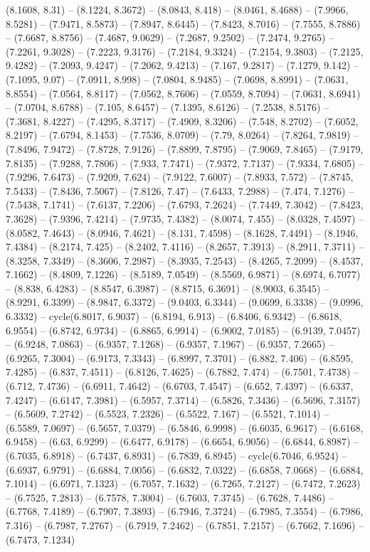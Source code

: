 (8.1608, 8.31) -- (8.1224, 8.3672) -- (8.0843, 8.418) -- (8.0461, 8.4688) -- (7.9966, 8.5281) -- (7.9471, 8.5873) -- (7.8947, 8.6445) -- (7.8423, 8.7016) -- (7.7555, 8.7886) -- (7.6687, 8.8756) -- (7.4687, 9.0629) -- (7.2687, 9.2502) -- (7.2474, 9.2765) -- (7.2261, 9.3028) -- (7.2223, 9.3176) -- (7.2184, 9.3324) -- (7.2154, 9.3803) -- (7.2125, 9.4282) -- (7.2093, 9.4247) -- (7.2062, 9.4213) -- (7.167, 9.2817) -- (7.1279, 9.142) -- (7.1095, 9.07) -- (7.0911, 8.998) -- (7.0804, 8.9485) -- (7.0698, 8.8991) -- (7.0631, 8.8554) -- (7.0564, 8.8117) -- (7.0562, 8.7606) -- (7.0559, 8.7094) -- (7.0631, 8.6941) -- (7.0704, 8.6788) -- (7.105, 8.6457) -- (7.1395, 8.6126) -- (7.2538, 8.5176) -- (7.3681, 8.4227) -- (7.4295, 8.3717) -- (7.4909, 8.3206) -- (7.548, 8.2702) -- (7.6052, 8.2197) -- (7.6794, 8.1453) -- (7.7536, 8.0709) -- (7.79, 8.0264) -- (7.8264, 7.9819) -- (7.8496, 7.9472) -- (7.8728, 7.9126) -- (7.8899, 7.8795) -- (7.9069, 7.8465) -- (7.9179, 7.8135) -- (7.9288, 7.7806) -- (7.933, 7.7471) -- (7.9372, 7.7137) -- (7.9334, 7.6805) -- (7.9296, 7.6473) -- (7.9209, 7.624) -- (7.9122, 7.6007) -- (7.8933, 7.572) -- (7.8745, 7.5433) -- (7.8436, 7.5067) -- (7.8126, 7.47) -- (7.6433, 7.2988) -- (7.474, 7.1276) -- (7.5438, 7.1741) -- (7.6137, 7.2206) -- (7.6793, 7.2624) -- (7.7449, 7.3042) -- (7.8423, 7.3628) -- (7.9396, 7.4214) -- (7.9735, 7.4382) -- (8.0074, 7.455) -- (8.0328, 7.4597) -- (8.0582, 7.4643) -- (8.0946, 7.4621) -- (8.131, 7.4598) -- (8.1628, 7.4491) -- (8.1946, 7.4384) -- (8.2174, 7.425) -- (8.2402, 7.4116) -- (8.2657, 7.3913) -- (8.2911, 7.3711) -- (8.3258, 7.3349) -- (8.3606, 7.2987) -- (8.3935, 7.2543) -- (8.4265, 7.2099) -- (8.4537, 7.1662) -- (8.4809, 7.1226) -- (8.5189, 7.0549) -- (8.5569, 6.9871) -- (8.6974, 6.7077) -- (8.838, 6.4283) -- (8.8547, 6.3987) -- (8.8715, 6.3691) -- (8.9003, 6.3545) -- (8.9291, 6.3399) -- (8.9847, 6.3372) -- (9.0403, 6.3344) -- (9.0699, 6.3338) -- (9.0996, 6.3332) -- cycle(6.8017, 6.9037) -- (6.8194, 6.913) -- (6.8406, 6.9342) -- (6.8618, 6.9554) -- (6.8742, 6.9734) -- (6.8865, 6.9914) -- (6.9002, 7.0185) -- (6.9139, 7.0457) -- (6.9248, 7.0863) -- (6.9357, 7.1268) -- (6.9357, 7.1967) -- (6.9357, 7.2665) -- (6.9265, 7.3004) -- (6.9173, 7.3343) -- (6.8997, 7.3701) -- (6.882, 7.406) -- (6.8595, 7.4285) -- (6.837, 7.4511) -- (6.8126, 7.4625) -- (6.7882, 7.474) -- (6.7501, 7.4738) -- (6.712, 7.4736) -- (6.6911, 7.4642) -- (6.6703, 7.4547) -- (6.652, 7.4397) -- (6.6337, 7.4247) -- (6.6147, 7.3981) -- (6.5957, 7.3714) -- (6.5826, 7.3436) -- (6.5696, 7.3157) -- (6.5609, 7.2742) -- (6.5523, 7.2326) -- (6.5522, 7.167) -- (6.5521, 7.1014) -- (6.5589, 7.0697) -- (6.5657, 7.0379) -- (6.5846, 6.9998) -- (6.6035, 6.9617) -- (6.6168, 6.9458) -- (6.63, 6.9299) -- (6.6477, 6.9178) -- (6.6654, 6.9056) -- (6.6844, 6.8987) -- (6.7035, 6.8918) -- (6.7437, 6.8931) -- (6.7839, 6.8945) -- cycle(6.7046, 6.9524) -- (6.6937, 6.9791) -- (6.6884, 7.0056) -- (6.6832, 7.0322) -- (6.6858, 7.0668) -- (6.6884, 7.1014) -- (6.6971, 7.1323) -- (6.7057, 7.1632) -- (6.7265, 7.2127) -- (6.7472, 7.2623) -- (6.7525, 7.2813) -- (6.7578, 7.3004) -- (6.7603, 7.3745) -- (6.7628, 7.4486) -- (6.7768, 7.4189) -- (6.7907, 7.3893) -- (6.7946, 7.3724) -- (6.7985, 7.3554) -- (6.7986, 7.316) -- (6.7987, 7.2767) -- (6.7919, 7.2462) -- (6.7851, 7.2157) -- (6.7662, 7.1696) -- (6.7473, 7.1234) 